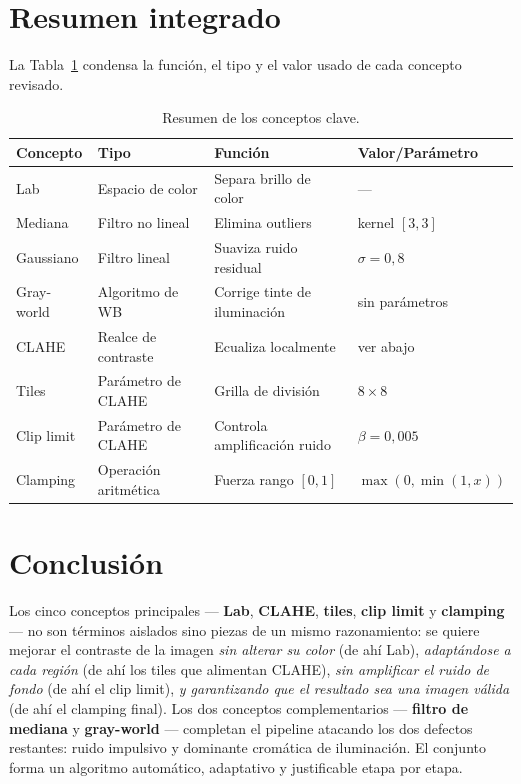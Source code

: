 \documentclass[11pt,a4paper]{article}
\begin{document}
\section{Resumen integrado}

La Tabla~\ref{tab:resumen} condensa la función, el tipo y el valor usado de
cada concepto revisado.

\begin{table}[H]
\centering
\caption{Resumen de los conceptos clave.}
\label{tab:resumen}
\renewcommand{\arraystretch}{1.3}
\begin{tabular}{@{}llll@{}}
\toprule
Concepto & Tipo & Función & Valor/Parámetro \\
\midrule
Lab                 & Espacio de color      & Separa brillo de color       & --- \\
Mediana             & Filtro no lineal      & Elimina outliers             & kernel \([3,3]\) \\
Gaussiano           & Filtro lineal         & Suaviza ruido residual       & \(\sigma = 0{,}8\) \\
Gray-world          & Algoritmo de WB       & Corrige tinte de iluminación & sin parámetros \\
CLAHE               & Realce de contraste   & Ecualiza localmente          & ver abajo \\
Tiles               & Parámetro de CLAHE    & Grilla de división           & \(8\times 8\) \\
Clip limit          & Parámetro de CLAHE    & Controla amplificación ruido & \(\beta = 0{,}005\) \\
Clamping            & Operación aritmética  & Fuerza rango \([0,1]\)       & \(\max(0, \min(1, x))\) \\
\bottomrule
\end{tabular}
\end{table}

\section{Conclusión}

Los cinco conceptos principales — \textbf{Lab}, \textbf{CLAHE}, \textbf{tiles},
\textbf{clip limit} y \textbf{clamping} — no son términos aislados sino piezas
de un mismo razonamiento: se quiere mejorar el contraste de la imagen \emph{sin
alterar su color} (de ahí Lab), \emph{adaptándose a cada región} (de ahí los
tiles que alimentan CLAHE), \emph{sin amplificar el ruido de fondo} (de ahí el
clip limit), \emph{y garantizando que el resultado sea una imagen válida} (de
ahí el clamping final). Los dos conceptos complementarios —
\textbf{filtro de mediana} y \textbf{gray-world} — completan el pipeline
atacando los dos defectos restantes: ruido impulsivo y dominante cromática
de iluminación. El conjunto forma un algoritmo automático, adaptativo y
justificable etapa por etapa.
\end{document}
